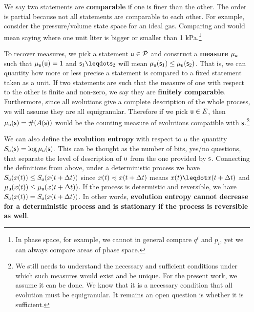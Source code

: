 \documentclass[letterpaper]{article}
\begin{document}
We say two statements are \textbf{comparable} if one is finer than the other. The order is partial because not all statements are comparable to each other. For example, consider the pressure/volume state space for an ideal gas. Comparing  and  would mean saying where one unit liter is bigger or smaller than 1 kPa.\footnote{In phase space, for example, we cannot in general compare $q^i$ and $p_i$, yet we can always compare areas of phase space.}

To recover measures, we pick a statement $\stmt[u] \in \tdomain[P]$ and construct a \textbf{measure} $\mu_{\stmt[u]}$ such that $\mu_{\stmt[u]}(\stmt[u]) = 1$ and $\stmt_1 \finer \stmt_2$ will mean $\mu_{\stmt[u]}(\stmt_1) \leq \mu_{\stmt[u]}(\stmt_2)$. That is, we can quantity how more or less precise a statement is compared to a fixed statement taken as a unit. If two statements are such that the measure of one with respect to the other is finite and non-zero, we say they are \textbf{finitely comparable}. Furthermore, since all evolutions give a complete description of the whole process, we will assume they are all equigranular. Therefore if we pick $\stmt[u] \in E$, then $\mu_{\stmt[u]}(\stmt)=\#(A(\stmt))$ would be the counting measure of evolutions compatible with $\stmt$.\footnote{We still needs to understand the necessary and sufficient conditions under which such measures would exist and be unique. For the present work, we assume it can be done. We know that it is a necessary condition that all evolution must be equigranular. It remains an open question is whether it is sufficient.}

We can also define the \textbf{evolution entropy} with respect to $\stmt[u]$ the quantity $S_{\stmt[u]}(\stmt) = \log \mu_{\stmt[u]}(\stmt)$. This can be thought as the number of bits, yes/no questions, that separate the level of description of $\stmt[u]$ from the one provided by $\stmt$. Connecting the definitions from above, under a deterministic process we have $S_{\stmt[u]}(x(t)) \leq S_{\stmt[u]}(x(t + \Delta t))$ since $x(t)\narrower x(t+\Delta t)$ means $x(t) \finer x(t+\Delta t)$ and $\mu_{\stmt[u]}(x(t)) \leq \mu_{\stmt[u]}(x(t+\Delta t))$. If the process is determistic and reversible, we have $S_{\stmt[u]}(x(t)) = S_{\stmt[u]}(x(t + \Delta t))$. In other words, \textbf{evolution entropy cannot decrease for a deterministic process and is stationary if the process is reversible as well}.
\end{document}
